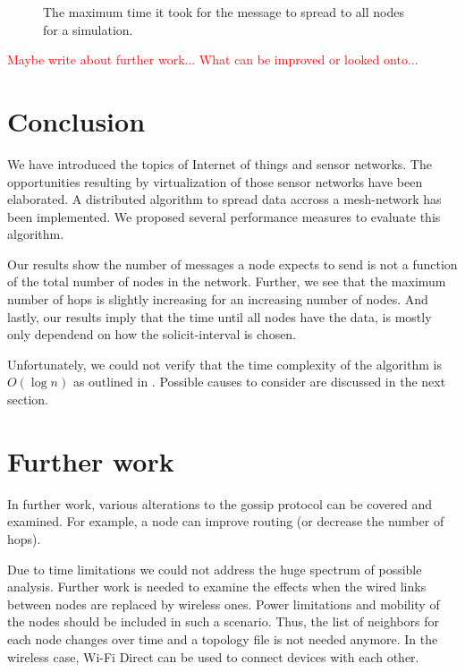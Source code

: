 \documentclass[12pt,journal]{IEEEtran}
\begin{document}
\begin{figure}
 \centering
 \caption{The maximum time it took for the message to spread to all nodes for a simulation.}
 \label{fig:maxtime}
\end{figure}

\textcolor{red}{Maybe write about further work... What can be improved or looked onto...}

\section{Conclusion}
We have introduced the topics of Internet of things and sensor networks. The opportunities resulting by virtualization of those sensor networks have been elaborated. A distributed algorithm to spread data accross a mesh-network has been implemented. We proposed several performance measures to evaluate this algorithm.

Our results show the number of messages a node expects to send is not a function of the total number of nodes in the network. Further, we see that the maximum number of hops is slightly increasing for an increasing number of nodes. And lastly, our results imply that the time until all nodes have the data, is mostly only dependend on how the solicit-interval is chosen.

Unfortunately, we could not verify that the time complexity of the algorithm is $O(\log n)$ as outlined in \cite{gossip}. Possible causes to consider are discussed in the next section.

\section{Further work}
In further work, various alterations to the gossip protocol can be covered and examined. For example, a node can improve routing (or decrease the number of hops). 


Due to time limitations we could not address the huge spectrum of possible analysis. Further work is needed to examine the effects when the wired links between nodes are replaced by wireless ones. Power limitations and mobility of the nodes should be included in such a scenario. Thus, the list of neighbors for each node changes over time and a topology file is not needed anymore. In the wireless case, Wi-Fi Direct can be used to connect devices with each other.

\end{document}
